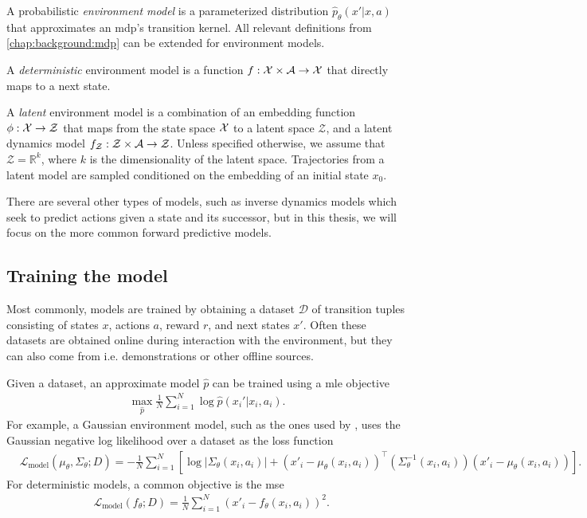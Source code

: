 \begin{definition}
    A probabilistic \emph{environment model} is a parameterized distribution $\hat{p}_\theta(x'|x,a)$ that approximates an \ac{mdp}'s transition kernel.
    All relevant definitions from \autoref{chap:background:mdp} can be extended for environment models.
    
    A \emph{deterministic} environment model is a function $f: \mathcal{X} \times \mathcal{A} \rightarrow \mathcal{X}$ that directly maps to a next state.

    A \emph{latent} environment model is a combination of an embedding function $\phi: \mathcal{X} \rightarrow \mathcal{Z}$ that maps from the state space $\mathcal{X}$ to a latent space $\mathcal{Z}$, and a latent dynamics model $f_\mathcal{Z}: \mathcal{Z} \times \mathcal{A} \rightarrow \mathcal{Z}$.
    Unless specified otherwise, we assume that $\mathcal{Z} = \mathbb{R}^k$, where $k$ is the dimensionality of the latent space.
    Trajectories from a latent model are sampled conditioned on the embedding of an initial state $x_0$.
\end{definition}


There are several other types of models, such as inverse dynamics models which seek to predict actions given a state and its successor, but in this thesis, we will focus on the more common forward predictive models.

\subsection{Training the model}

Most commonly, models are trained by obtaining a dataset $\mathcal{D}$ of transition tuples consisting of states $x$, actions $a$, reward $r$, and next states $x'$. 
Often these datasets are obtained online during interaction with the environment, but they can also come from i.e. demonstrations or other offline sources.

Given a dataset, an approximate model $\hat{p}$ can be trained using a \ac{mle} objective 
\begin{align}
\max_{\hat{p}} \frac{1}{N}\sum_{i=1}^N \log \hat{p}(x_i'|x_i,a_i).
\end{align}
For example, a Gaussian environment model, such as the ones used by \textcite{pets,mbpo,voelcker2022value}, uses the Gaussian negative log likelihood over a dataset as the loss function
\begin{align}
    &\mathcal{L}_\mathrm{model}(\mu_\theta, \Sigma_\theta; D) = - \frac{1}{N} \sum_{i=1}^N \left[\log |\Sigma_\theta(x_i, a_i)| + (x'_i - \mu_\theta(x_i, a_i))^\top \left(\Sigma^{-1}_\theta(x_i, a_i) \right) (x'_i - \mu_\theta(x_i, a_i)) \right].
\end{align}
For deterministic models, a common objective is the \ac{mse}
\begin{align}
    &\mathcal{L}_\mathrm{model}(f_\theta; D) = \frac{1}{N} \sum_{i=1}^N (x'_i - f_\theta(x_i, a_i))^2.
\end{align}

